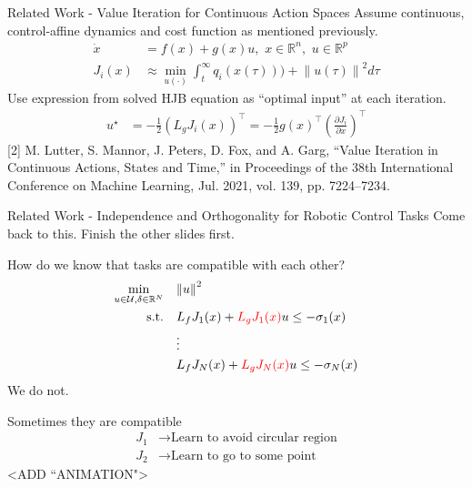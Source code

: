 \begin{frame}{Related Work - Value Iteration for Continuous Action Spaces}
	Assume continuous, control-affine dynamics and cost function as mentioned previously.
	\begin{align*}
		\dot{x} &= f(x) + g(x)u, \,\, x \in \mathbb{R}^n, \,\, u \in \mathbb{R}^p \\
		J_i (x) &\approx \min_{u(\cdot)} \int_t^{\infty} q_i(x(\tau))) + {\lVert u(\tau) \rVert}^2 d \tau
	\end{align*}
	Use expression from solved HJB equation as ``optimal input'' at each iteration.
	\begin{align*}
		u^{\star} &= - \frac{1}{2} ( L_g {J}_i (x) )^{\top} = - \frac{1}{2} g(x)^{\top} \left( \frac{\partial {J}_i}{\partial x} \right)^{\top}
	\end{align*}
	\seprule
	\footnotesize{[2] M. Lutter, S. Mannor, J. Peters, D. Fox, and A. Garg, “Value Iteration in Continuous Actions, States and Time,” in Proceedings of the 38th International Conference on Machine Learning, Jul. 2021, vol. 139, pp. 7224–7234.}
\end{frame}

\begin{frame}{Related Work - Independence and Orthogonality for Robotic Control Tasks}
	Come back to this. Finish the other slides first.
\end{frame}

\begin{frame}{How do we know that tasks are compatible with each other?}
	\begin{align*}
		\min_{u \in \mathcal{U}, \delta \in \mathbb{R}^N} \quad & { \lVert u \rVert }^2 \\
		\textrm{s.t.} \quad & L_f {J}_1 (x) + { \color{red} L_g {J}_1 (x) } u \le - \sigma_1(x) \\
                \quad & \vdots \\
		\quad & L_f {J}_N (x) + { \color{red} L_g {J}_N (x) } u \le - \sigma_N(x) \\
	\end{align*}
	\centering
	We do not.
\end{frame}

\begin{frame}{Sometimes they are compatible}
	\begin{align*}
		{J}_1 &\rightarrow \textrm{Learn to avoid circular region} \\
		{J}_2 &\rightarrow \textrm{Learn to go to some point}
	\end{align*}
	<ADD ``ANIMATION">
\end{frame}

